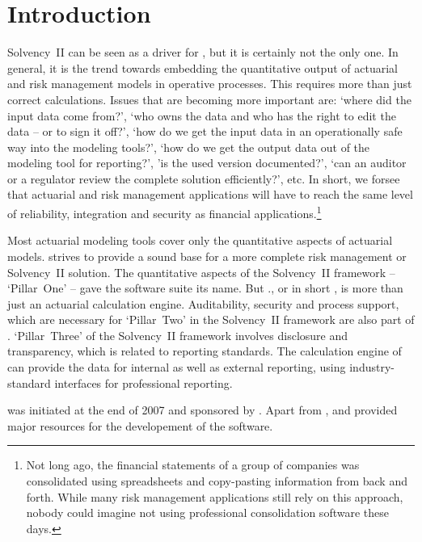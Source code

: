 \chapter{Introduction}
\label{chap:refguide-intro} 

Solvency~II can be seen as a driver for \RA, but it is certainly not the only one. In general, it is the trend towards embedding the quantitative output of actuarial and risk management models in operative processes. This requires more than just correct calculations. Issues that are becoming more important are: `where did the input data come from?', `who owns the data and who has the right to edit the data -- or to sign it off?', `how do we get the input data in an operationally safe way into the modeling tools?', `how do we get the output data out of the modeling tool for reporting?', 'is the used version documented?', `can an auditor or a regulator review the complete solution efficiently?', etc. In short, we forsee that actuarial and risk management applications will have to reach the same level of reliability, integration and security as financial applications.\footnote{Not long ago, the financial statements of a group of companies was consolidated using spreadsheets and copy-pasting information from back and forth. While many risk management applications still rely on this approach, nobody could imagine not using professional consolidation software these days.}

Most actuarial modeling tools cover only the quantitative aspects of actuarial models. \RA{} strives to provide a sound base for a more complete risk management or Solvency~II solution. The quantitative aspects of the Solvency~II framework -- `Pillar~One' -- gave the software suite its name. But {\PO.\RA}, or in short \RA, is more than just an actuarial calculation engine. Auditability, security and process support, which are necessary for `Pillar~Two' in the Solvency~II framework are also part of \RA. `Pillar~Three' of the Solvency~II framework involves disclosure and transparency, which is related to reporting standards.  The calculation engine of \RA{} can provide the data for internal as well as external reporting, using industry-standard interfaces for professional reporting.

\PO{} was initiated at the end of 2007 and sponsored by \href{http://www.munichre.com}{\MR{}}. Apart from \MR, \href{http://www.Intuitive-Collaboration.com}{\IC{}} and \href{http://www.canoo.com}{\Canoo{}} provided major resources for the developement of the software.

